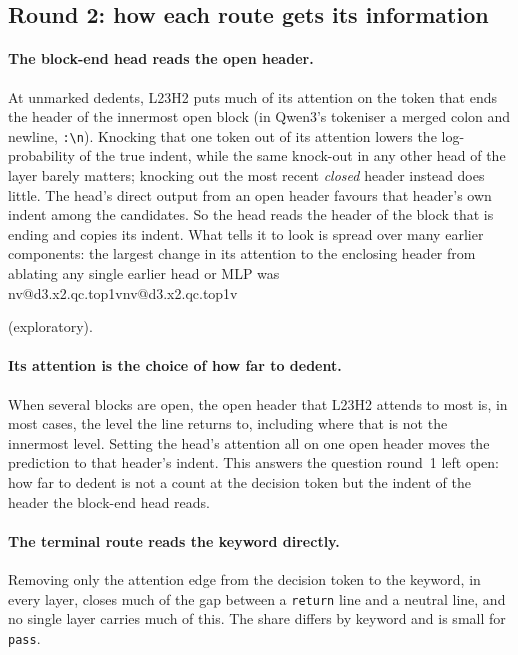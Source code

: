 \documentclass[11pt]{article}
\makeatletter
\newcommand{\nv}[1]{\ifcsname nv@#1\endcsname\csname nv@#1\endcsname\else\PackageError{numbers}{Unknown number key #1}{}\fi}
\newcommand{\hd}[2]{L#1H#2}
\newcommand{\code}[1]{\texttt{#1}}
\makeatother
\begin{document}
\subsection{Round 2: how each route gets its information}

\paragraph{The block-end head reads the open header.} At unmarked dedents, \hd{23}{2} puts much of its attention on the token that ends the header of the innermost open block (in Qwen3's tokeniser a merged colon and newline, \code{:\textbackslash n}). Knocking that one token out of its attention lowers the log-probability of the true indent, while the same knock-out in any other head of the layer barely matters; knocking out the most recent \emph{closed} header instead does little. The head's direct output from an open header favours that header's own indent among the candidates. So the head reads the header of the block that is ending and copies its indent. What tells it to look is spread over many earlier components: the largest change in its attention to the enclosing header from ablating any single earlier head or MLP was \nv{d3.x2.qc.top1v} (exploratory).

\paragraph{Its attention is the choice of how far to dedent.} When several blocks are open, the open header that \hd{23}{2} attends to most is, in most cases, the level the line returns to, including where that is not the innermost level. Setting the head's attention all on one open header moves the prediction to that header's indent. This answers the question round~1 left open: how far to dedent is not a count at the decision token but the indent of the header the block-end head reads.

\paragraph{The terminal route reads the keyword directly.} Removing only the attention edge from the decision token to the keyword, in every layer, closes much of the gap between a \code{return} line and a neutral line, and no single layer carries much of this. The share differs by keyword and is small for \code{pass}.
\end{document}
